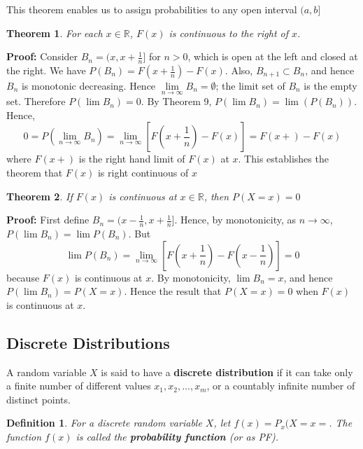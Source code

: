 \documentclass{article}
\newtheorem{definition}{Definition}[section]
\newtheorem{theorem}{Theorem}[section]
\begin{document}
This theorem enables us to assign probabilities to any open interval \((a,b]\)

\begin{theorem}
    For each \(x \in \mathbb{R}\), \(F(x)\) is continuous to the right of \(x\).
\end{theorem}

\textbf{Proof:} Consider \(B_n=(x,x+ \frac{1}{n}]\) for \(n>0\), which is open at the left and closed at the right. We have \(P(B_n)=F(x+ \frac{1}{n}) - F(x)\). Also, \(B_{n+1} \subset B_n\), and hence \(B_n\) is monotonic decreasing. Hence \(\lim\limits_{n \rightarrow \infty} B_n = \emptyset\); the limit set of \(B_n\) is the empty set. Therefore \(P(\lim B_n) = 0\). By Theorem 9, \(P(\lim B_n)= \lim(P(B_n))\). Hence,
\begin{equation*}
    0 = P \left(\lim\limits_{n \rightarrow \infty} B_n\right) = \lim\limits_{n \rightarrow \infty} \left[F(x + \frac{1}{n})-F(x)\right] = F(x+)-F(x)
\end{equation*}
where \(F(x+)\) is the right hand limit of \(F(x)\) at \(x\). This establishes the theorem that \(F(x)\) is right continuous of \(x\)

\begin{theorem}
    If \(F(x)\) is continuous at \(x \in \mathbb{R}\), then \(P(X=x)=0\)
\end{theorem}

\textbf{Proof:} First define \(B_n = (x-\frac{1}{n}, x+\frac{1}{n}]\). Hence, by monotonicity, as \(n \rightarrow \infty\), \(P(\lim B_n)=\lim P(B_n)\). But
\begin{equation*}
    \lim P(B_n) = \lim\limits_{n \rightarrow \infty} \left[F \left(x+\frac{1}{n}\right) - F \left(x-\frac{1}{n}\right) \right] = 0
\end{equation*}
because \(F(x)\) is continuous at \(x\). By monotonicity, \(\lim B_n = x\), and hence \(P (\lim B_n) = P(X=x)\). Hence the result that \(P(X=x)=0\) when \(F(x)\) is continuous at \(x\).

\subsection{Discrete Distributions}

A random variable \(X\) is said to have a \textbf{discrete distribution} if it can take only a finite number of different values \(x_1, x_2, ..., x_m\), or a countably infinite number of distinct points.

\begin{definition}
    For a discrete random variable \(X\), let \(f(x) = P_x(X=x=\). The function \(f(x)\) is called the \textbf{probability function} (or as PF).
\end{definition}
\end{document}
